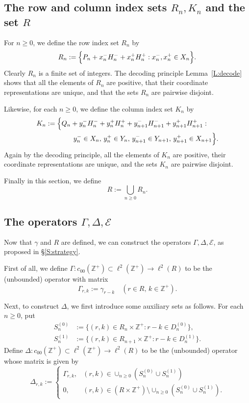 \documentclass[11pt,reqno]{amsart}
\theoremstyle{plain}
\theoremstyle{definition}
\theoremstyle{remark}
\newcommand{\cE}{\mathcal{E}}
\newcommand{\ZZ}{\mathbb{Z}}
\begin{document}

\subsection{The row and column index sets $R_n,K_n$
and the set $R$}

For $n\ge0$, we define the row index set $R_n$ by
\[
R_n:=\Bigl\{P_n+x_n^-H_n^-+x_n^+H_n^+: x_n^-,x_n^+\in X_n\Bigr\}.
\]
Clearly $R_n$ is a finite set of integers. The decoding principle Lemma~\ref{L:decode} shows that all the elements of $R_n$ are positive,
that their coordinate representations are unique,
and that the sets $R_n$ are pairwise disjoint.

Likewise, for each $n\ge0$, we define the column index set $K_n$ by
\begin{align*}
K_n&:=\Bigl\{Q_n+y_n^-H_n^-+y_n^+H_n^++y_{n+1}^-H_{n+1}^-+y_{n+1}^+H_{n+1}^+: \\
&\qquad\qquad y_n^-\in X_n,\, y_n^+\in Y_n,\, y_{n+1}^-\in Y_{n+1}, \, y_{n+1}^+\in X_{n+1}\Bigr\}.
\end{align*}
Again by the decoding principle, all the elements of $K_n$ are positive, 
their coordinate representations are unique,  and the sets $K_n$ 
are pairwise disjoint.

Finally in this section, we define
\[
R:=\bigcup_{n\ge0}R_n.
\]


\subsection{The operators $\Gamma,\Delta,\cE$}\label{S:GDE}

Now that $\gamma$ and $R$ are defined, we can construct
the operators $\Gamma,\Delta,\cE$, as proposed in
\S\ref{S:strategy}. 

First of all, we define $\Gamma:c_{00}(\ZZ^+)\subset\ell^2(\ZZ^+)\to\ell^2(R)$ to be the (unbounded) operator with matrix
\[
\Gamma_{r,k}:=\gamma_{r-k} \quad(r\in R,\,k\in\ZZ^+).
\]

Next, to construct $\Delta$, we first introduce some auxiliary sets as follows. For each $n\ge0$, put
\begin{align*}
S_n^{(0)}&:=\{(r,k)\in  R_n\times \ZZ^+: r-k\in D_n^{(0)}\},\\
S_n^{(1)}&:=\{(r,k)\in  R_{n+1}\times \ZZ^+ : r-k\in D_n^{(1)}\}.
\end{align*}
Define $\Delta:c_{00}(\ZZ^+)\subset\ell^2(\ZZ^+)\to\ell^2(R)$
to be the (unbounded) operator whose matrix is given by
\[
\Delta_{r,k}:=
\begin{cases}
\Gamma_{r,k}, &(r,k)\in \cup_{n\ge0}(S_n^{(0)}\cup S_n^{(1)})\\
0, &(r,k)\in (R\times\ZZ^+)\setminus \cup_{n\ge0}(S_n^{(0)}\cup S_n^{(1)}).
\end{cases}
\]
\end{document}
